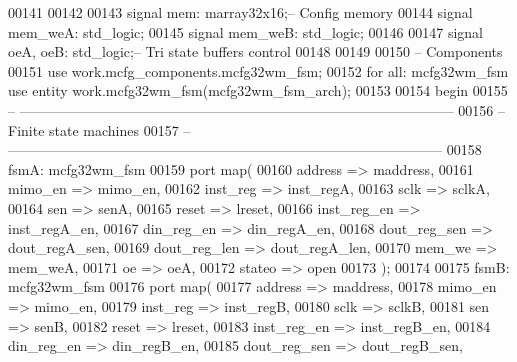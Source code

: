 \begin{DoxyCode}
00141 
00142 
00143 \textcolor{keywordflow}{signal} \textcolor{vhdlchar}{mem}\textcolor{vhdlchar}{:} \textcolor{vhdlchar}{marray32x16};\textcolor{keyword}{-- Config memory}
00144 \textcolor{keywordflow}{signal} \textcolor{vhdlchar}{mem_weA}\textcolor{vhdlchar}{:} \textcolor{comment}{std\_logic};
00145 \textcolor{keywordflow}{signal} \textcolor{vhdlchar}{mem_weB}\textcolor{vhdlchar}{:} \textcolor{comment}{std\_logic};
00146 
00147 \textcolor{keywordflow}{signal} \textcolor{vhdlchar}{oeA}\textcolor{vhdlchar}{,} \textcolor{vhdlchar}{oeB}\textcolor{vhdlchar}{:} \textcolor{comment}{std\_logic};\textcolor{keyword}{-- Tri state buffers control}
00148 
00149 
00150 \textcolor{keyword}{-- Components}
00151 \textcolor{vhdlkeyword}{use }work.mcfg_components.mcfg32wm\_fsm;
00152 \textcolor{keywordflow}{for} \textcolor{keywordflow}{all}\textcolor{vhdlchar}{:} \textcolor{vhdlchar}{mcfg32wm\_fsm} \textcolor{keywordflow}{use} \textcolor{keywordflow}{entity} \textcolor{vhdlchar}{work}\textcolor{vhdlchar}{.}\textcolor{vhdlchar}{mcfg32wm\_fsm}\textcolor{vhdlchar}{(}\textcolor{vhdlchar}{mcfg32wm\_fsm\_arch}\textcolor{vhdlchar}{)};
00153 
00154 \textcolor{vhdlkeyword}{begin}
00155 \textcolor{keyword}{-- ---------------------------------------------------------------------------------------------}
00156 \textcolor{keyword}{-- Finite state machines}
00157 \textcolor{keyword}{-- ---------------------------------------------------------------------------------------------}
00158 fsmA: mcfg32wm_fsm 
00159    \textcolor{keywordflow}{port} \textcolor{keywordflow}{map}( 
00160       address        => maddress, 
00161       mimo_en        => mimo_en, 
00162       inst_reg       => inst_regA, 
00163       sclk           => sclkA, 
00164       sen            => senA, 
00165       reset          => lreset, 
00166       inst_reg_en    => inst_regA_en, 
00167       din_reg_en     => din_regA_en, 
00168       dout_reg_sen   => dout_regA_sen, 
00169       dout_reg_len   => dout_regA_len, 
00170       mem_we         => mem_weA, 
00171       oe             => oeA, 
00172       stateo         => \textcolor{keywordflow}{open}
00173       \textcolor{vhdlchar}{)};
00174 
00175 fsmB: mcfg32wm_fsm 
00176    \textcolor{keywordflow}{port} \textcolor{keywordflow}{map}( 
00177       address        => maddress, 
00178       mimo_en        => mimo_en, 
00179       inst_reg       => inst_regB, 
00180       sclk           => sclkB, 
00181       sen            => senB, 
00182       reset          => lreset,
00183       inst_reg_en    => inst_regB_en, 
00184       din_reg_en     => din_regB_en, 
00185       dout_reg_sen   => dout_regB_sen,

\end{DoxyCode}
